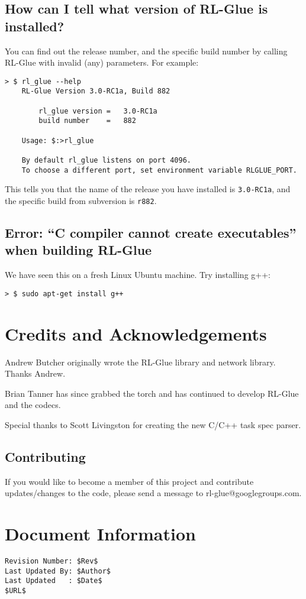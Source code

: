 \documentclass[11pt]{article}
\begin{document}
\subsection{How can I tell what version of RL-Glue is installed?}
You can find out the release number, and the specific build number by 
calling RL-Glue with invalid (any) parameters.  For example:
\begin{verbatim}
> $ rl_glue --help
    RL-Glue Version 3.0-RC1a, Build 882

        rl_glue version	=	3.0-RC1a
        build number	=	882

    Usage: $:>rl_glue

    By default rl_glue listens on port 4096.
    To choose a different port, set environment variable RLGLUE_PORT.
\end{verbatim}

This tells you that the name of the release you have installed is \texttt{3.0-RC1a}, and the 
specific build from subversion is \texttt{r882}.


\subsection{Error: ``C compiler cannot create executables'' when building RL-Glue}

We have seen this on a fresh Linux Ubuntu machine.  Try installing g++:
\begin{verbatim}
> $ sudo apt-get install g++
\end{verbatim}


\section{Credits and Acknowledgements}
Andrew Butcher originally wrote the RL-Glue library and network library.  Thanks Andrew.

Brian Tanner has since grabbed the torch and has continued to develop RL-Glue and the codecs.

Special thanks to Scott Livingston for creating the new C/C++ task spec parser.

\subsection{Contributing}
If you would like to become a member of this project and contribute updates/changes to the code, please send a message to rl-glue@googlegroups.com.


\section*{Document Information}
\begin{verbatim}
Revision Number: $Rev$
Last Updated By: $Author$
Last Updated   : $Date$
$URL$
\end{verbatim}
\end{document}
